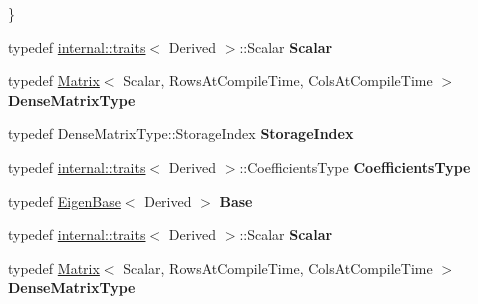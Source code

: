 \begin{DoxyCompactItemize}
 \}
\item 
\mbox{\label{class_eigen_1_1internal_1_1_band_matrix_base_afca234d64175589fd9f35bb54e99a0cb}} 
typedef \hyperlink{struct_eigen_1_1internal_1_1traits}{internal\+::traits}$<$ Derived $>$\+::Scalar {\bfseries Scalar}
\item 
\mbox{\label{class_eigen_1_1internal_1_1_band_matrix_base_a4b465b7b73aa09b04a05f9d94f6a7f58}} 
typedef \hyperlink{group___core___module_class_eigen_1_1_matrix}{Matrix}$<$ Scalar, Rows\+At\+Compile\+Time, Cols\+At\+Compile\+Time $>$ {\bfseries Dense\+Matrix\+Type}
\item 
\mbox{\label{class_eigen_1_1internal_1_1_band_matrix_base_a2f52fc1689db7ecbf7abe30d2b184f65}} 
typedef Dense\+Matrix\+Type\+::\+Storage\+Index {\bfseries Storage\+Index}
\item 
\mbox{\label{class_eigen_1_1internal_1_1_band_matrix_base_a17c354627a5d45343b09ed4254b2871c}} 
typedef \hyperlink{struct_eigen_1_1internal_1_1traits}{internal\+::traits}$<$ Derived $>$\+::Coefficients\+Type {\bfseries Coefficients\+Type}
\item 
\mbox{\label{class_eigen_1_1internal_1_1_band_matrix_base_af06810be4827bc9268e0d02fea6b4e62}} 
typedef \hyperlink{group___core___module_struct_eigen_1_1_eigen_base}{Eigen\+Base}$<$ Derived $>$ {\bfseries Base}
\item 
\mbox{\label{class_eigen_1_1internal_1_1_band_matrix_base_afca234d64175589fd9f35bb54e99a0cb}} 
typedef \hyperlink{struct_eigen_1_1internal_1_1traits}{internal\+::traits}$<$ Derived $>$\+::Scalar {\bfseries Scalar}
\item 
\mbox{\label{class_eigen_1_1internal_1_1_band_matrix_base_a4b465b7b73aa09b04a05f9d94f6a7f58}} 
typedef \hyperlink{group___core___module_class_eigen_1_1_matrix}{Matrix}$<$ Scalar, Rows\+At\+Compile\+Time, Cols\+At\+Compile\+Time $>$ {\bfseries Dense\+Matrix\+Type}
\item 
\mbox{\label{class_eigen_1_1internal_1_1_band_matrix_base_a2f52fc1689db7ecbf7abe30d2b184f65}} 

\end{DoxyCompactItemize}

